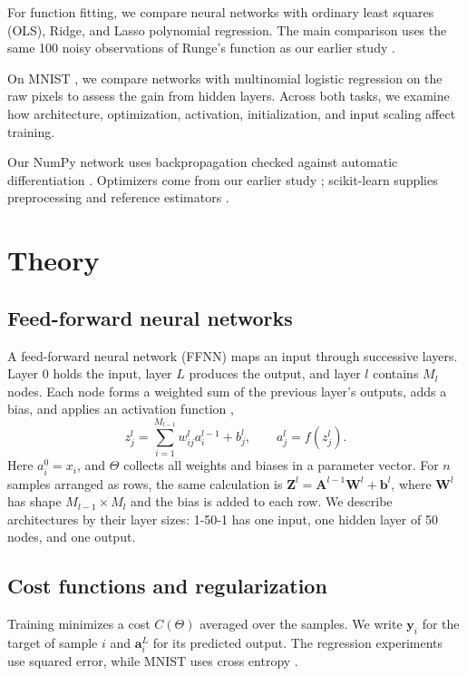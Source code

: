 \documentclass[aps,prb,reprint,superscriptaddress,nofootinbib,longbibliography,floatfix]{revtex4-2}
\begin{document}
For function fitting, we compare neural networks with ordinary least squares (OLS), Ridge, and Lasso polynomial regression. The main comparison uses the same 100 noisy observations of Runge's function as our earlier study \cite{Ozdber2026}.

On MNIST \cite{LeCun2010,LeCun1998}, we compare networks with multinomial logistic regression on the raw pixels to assess the gain from hidden layers. Across both tasks, we examine how architecture, optimization, activation, initialization, and input scaling affect training.

Our NumPy network uses backpropagation checked against automatic differentiation \cite{Harris2020}. Optimizers come from our earlier study \cite{Ozdber2026}; scikit-learn supplies preprocessing and reference estimators \cite{Pedregosa2011}.

\section{Theory}\label{sec:theory}

\subsection{Feed-forward neural networks}\label{sec:network}
A feed-forward neural network (FFNN) maps an input through successive layers. Layer 0 holds the input, layer $L$ produces the output, and layer $l$ contains $M_l$ nodes. Each node forms a weighted sum of the previous layer's outputs, adds a bias, and applies an activation function \cite[Sec.~8.5]{HjorthJensen2026},
\begin{equation}
z_j^l=\sum_{i=1}^{M_{l-1}}w_{ij}^l a_i^{l-1}+b_j^l,
\qquad a_j^l=f\!\left(z_j^l\right).
\label{eq:node}
\end{equation}
Here $a_i^0=x_i$, and $\Theta$ collects all weights and biases in a parameter vector. For $n$ samples arranged as rows, the same calculation is $\bm Z^l=\bm A^{l-1}\bm W^l+\bm b^l$, where $\bm W^l$ has shape $M_{l-1}\times M_l$ and the bias is added to each row. We describe architectures by their layer sizes: 1-50-1 has one input, one hidden layer of 50 nodes, and one output.

\subsection{Cost functions and regularization}\label{sec:costs}
Training minimizes a cost $C(\Theta)$ averaged over the samples. We write $\bm y_i$ for the target of sample $i$ and $\bm a_i^L$ for its predicted output. The regression experiments use squared error, while MNIST uses cross entropy \cite[Secs.~5.3, 5.6 and 8.7]{HjorthJensen2026}.
\end{document}
